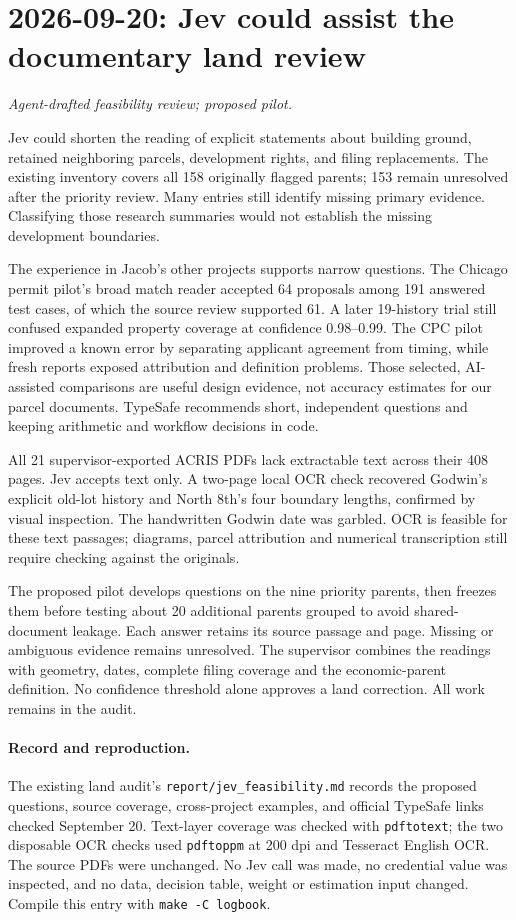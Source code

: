 \clearpage
\section*{2026-09-20: Jev could assist the documentary land review}
\textit{Agent-drafted feasibility review; proposed pilot.}

Jev could shorten the reading of explicit statements about building ground,
retained neighboring parcels, development rights, and filing replacements.
The existing inventory covers all 158 originally flagged parents; 153 remain
unresolved after the priority review. Many entries still identify missing
primary evidence. Classifying those research summaries would not establish
the missing development boundaries.

The experience in Jacob's other projects supports narrow questions. The Chicago
permit pilot's broad match reader accepted 64 proposals among 191 answered test
cases, of which the source review supported 61. A later 19-history trial still
confused expanded property coverage at confidence 0.98--0.99. The CPC pilot
improved a known error by separating applicant agreement from timing, while
fresh reports exposed attribution and definition problems. Those selected,
AI-assisted comparisons are useful design evidence, not accuracy estimates for
our parcel documents. TypeSafe recommends short, independent questions and
keeping arithmetic and workflow decisions in code.

All 21 supervisor-exported ACRIS PDFs lack extractable text across their 408
pages. Jev accepts text only. A two-page local OCR check recovered Godwin's
explicit old-lot history and North 8th's four boundary lengths, confirmed by
visual inspection. The handwritten Godwin date was garbled. OCR is feasible
for these text passages; diagrams, parcel attribution and numerical transcription
still require checking against the originals.

The proposed pilot develops questions on the nine priority parents, then freezes
them before testing about 20 additional parents grouped to avoid shared-document
leakage. Each answer retains its source passage and page. Missing or ambiguous
evidence remains unresolved. The supervisor combines the readings with geometry,
dates, complete filing coverage and the economic-parent definition. No confidence
threshold alone approves a land correction. All work remains in the audit.

\paragraph{Record and reproduction.}
The existing land audit's \texttt{report/jev\_feasibility.md} records the proposed
questions, source coverage, cross-project examples, and official TypeSafe links
checked September 20. Text-layer coverage was checked with \texttt{pdftotext};
the two disposable OCR checks used \texttt{pdftoppm} at 200 dpi and Tesseract
English OCR. The source PDFs were unchanged. No Jev call was made, no credential
value was inspected, and no data, decision table, weight or estimation input
changed. Compile this entry with \texttt{make -C logbook}.
